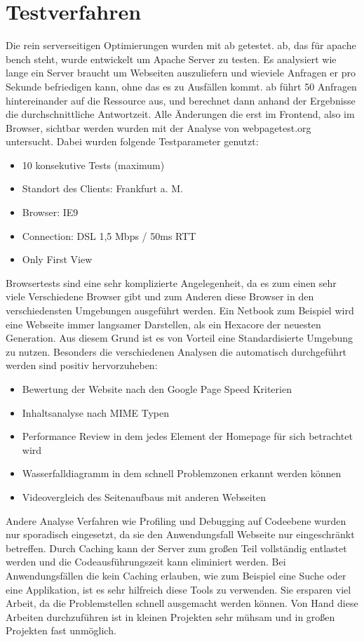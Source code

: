 \section{Testverfahren}
Die rein serverseitigen Optimierungen wurden mit ab getestet. ab, das für apache bench steht, wurde entwickelt um Apache Server zu testen. Es analysiert wie lange ein Server braucht um Webseiten auszuliefern und wieviele Anfragen er pro Sekunde befriedigen kann, ohne das es zu Ausfällen kommt. ab führt 50 Anfragen hintereinander auf die Ressource aus, und berechnet dann anhand der Ergebnisse die durchschnittliche Antwortzeit. Alle Änderungen die erst im Frontend, also im Browser, sichtbar werden wurden mit der Analyse von  webpagetest.org untersucht. Dabei wurden folgende Testparameter genutzt:
\begin{itemize}
  \item 10 konsekutive Tests (maximum) 
  \item Standort des Clients: Frankfurt a. M.
  \item Browser: IE9
  \item Connection: DSL 1,5 Mbps / 50ms RTT
  \item Only First View
\end{itemize}
Browsertests sind eine sehr komplizierte Angelegenheit, da es zum einen sehr viele Verschiedene Browser gibt und zum Anderen diese Browser in den verschiedensten Umgebungen ausgeführt werden. Ein Netbook zum Beispiel wird eine Webseite immer langsamer Darstellen, als ein Hexacore der neuesten Generation. Aus diesem Grund ist es von Vorteil eine Standardisierte Umgebung zu nutzen. Besonders die verschiedenen Analysen die automatisch durchgeführt werden sind positiv hervorzuheben:
\begin{itemize}
 \item Bewertung der Website nach den Google Page Speed Kriterien
 \item Inhaltsanalyse nach MIME Typen
 \item Performance Review in dem jedes Element der Homepage für sich betrachtet wird 
 \item Wasserfalldiagramm in dem schnell Problemzonen erkannt werden können
 \item Videovergleich des Seitenaufbaus mit anderen Webseiten
\end{itemize}
Andere Analyse Verfahren wie Profiling und Debugging auf Codeebene wurden nur sporadisch eingesetzt, da sie den Anwendungsfall Webseite nur eingeschränkt betreffen. Durch Caching kann der Server zum großen Teil vollständig entlastet werden und die Codeausführungszeit kann eliminiert werden. Bei Anwendungsfällen die kein Caching erlauben, wie zum Beispiel eine Suche oder eine Applikation, ist es sehr hilfreich diese Tools zu verwenden. Sie ersparen viel Arbeit, da die Problemstellen schnell ausgemacht werden können. Von Hand diese Arbeiten durchzuführen ist in kleinen Projekten sehr mühsam und in großen Projekten fast unmöglich. 


